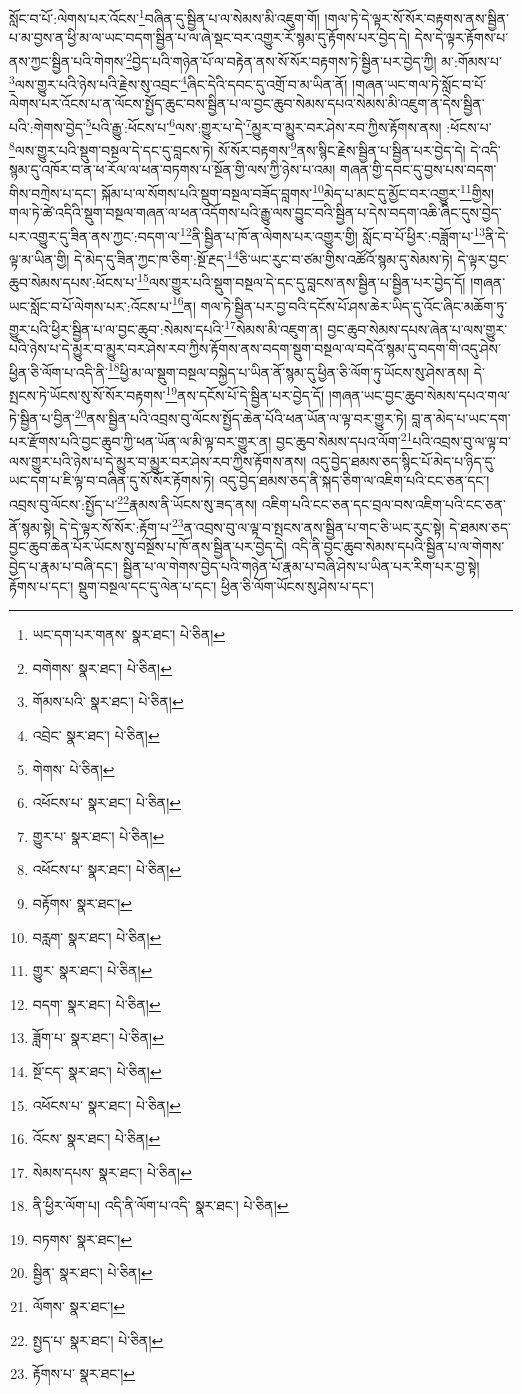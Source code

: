 སློང་བ་པོ་:ལེགས་པར་འོངས་\footnote{ཡང་དག་པར་གནས་  སྣར་ཐང་།  པེ་ཅིན། }བཞིན་དུ་སྦྱིན་པ་ལ་སེམས་མི་འཇུག་གོ། །གལ་ཏེ་དེ་ལྟར་སོ་སོར་བརྟགས་ནས་སྦྱིན་པ་མ་བྱས་ན་ཕྱི་མ་ལ་ཡང་བདག་སྦྱིན་པ་ལ་ཞེ་སྡང་བར་འགྱུར་རོ་སྙམ་དུ་རྟོགས་པར་བྱེད་དེ། དེས་དེ་ལྟར་རྟོགས་པ་ནས་ཀྱང་སྦྱིན་པའི་གེགས་\footnote{བགེགས་  སྣར་ཐང་།  པེ་ཅིན། }བྱེད་པའི་གཉེན་པོ་ལ་བརྟེན་ནས་སོ་སོར་བརྟགས་ཏེ་སྦྱིན་པར་བྱེད་ཀྱི། མ་:གོམས་པ་\footnote{གོམས་པའི་  སྣར་ཐང་།  པེ་ཅིན། }ལས་གྱུར་པའི་ཉེས་པའི་རྗེས་སུ་འབྲང་\footnote{འབྲེང་  སྣར་ཐང་།  པེ་ཅིན། }ཞིང་དེའི་དབང་དུ་འགྲོ་བ་མ་ཡིན་ནོ། །གཞན་ཡང་གལ་ཏེ་སློང་བ་པོ་ལེགས་པར་འོངས་པ་ན་ལོངས་སྤྱོད་ཆུང་བས་སྦྱིན་པ་ལ་བྱང་ཆུབ་སེམས་དཔའ་སེམས་མི་འཇུག་ན་དེས་སྦྱིན་པའི་:གེགས་བྱེད་\footnote{གེགས་  པེ་ཅིན། }པའི་རྒྱུ་:ཕོངས་པ་\footnote{འཕོངས་པ་  སྣར་ཐང་།  པེ་ཅིན། }ལས་:གྱུར་པ་དེ་\footnote{གྱུར་པ་  སྣར་ཐང་།  པེ་ཅིན། }མྱུར་བ་མྱུར་བར་ཤེས་རབ་ཀྱིས་རྟོགས་ནས། :ཕོངས་པ་\footnote{འཕོངས་པ་  སྣར་ཐང་།  པེ་ཅིན། }ལས་གྱུར་པའི་སྡུག་བསྔལ་དེ་དང་དུ་བླངས་ཏེ། སོ་སོར་བརྟགས་\footnote{བརྟོགས་  སྣར་ཐང་། }ནས་སྙིང་རྗེས་སྦྱིན་པ་སྦྱིན་པར་བྱེད་དེ། དེ་འདི་སྙམ་དུ་འཁོར་བ་ན་ཕ་རོལ་ལ་ཕན་བཏགས་པ་སྔོན་གྱི་ལས་ཀྱི་ཉེས་པ་འམ། གཞན་གྱི་དབང་དུ་བྱས་པས་བདག་གིས་བཀྲེས་པ་དང་། སྐོམ་པ་ལ་སོགས་པའི་སྡུག་བསྔལ་བཟོད་བླགས་\footnote{བརླག་  སྣར་ཐང་།  པེ་ཅིན། }མེད་པ་མང་དུ་མྱོང་བར་འགྱུར་\footnote{གྱུར་  སྣར་ཐང་།  པེ་ཅིན། }གྱིས། གལ་ཏེ་ཚེ་འདིའི་སྡུག་བསྔལ་གཞན་ལ་ཕན་འདོགས་པའི་རྒྱུ་ལས་བྱུང་བའི་སྦྱིན་པ་དེས་བདག་འཆི་ཞིང་དུས་བྱེད་པར་འགྱུར་དུ་ཟིན་ནས་ཀྱང་:བདག་ལ་\footnote{བདག་  སྣར་ཐང་།  པེ་ཅིན། }ནི་སྦྱིན་པ་ཁོ་ན་ལེགས་པར་འགྱུར་གྱི། སློང་བ་པོ་ཕྱིར་:བཟློག་པ་\footnote{ཟློག་པ་  སྣར་ཐང་།  པེ་ཅིན། }ནི་དེ་ལྟ་མ་ཡིན་གྱི། དེ་མེད་དུ་ཟིན་ཀྱང་ཁ་ཅིག་:སྔོ་རྔད་\footnote{སྔོ་ངད་  སྣར་ཐང་།  པེ་ཅིན། }ཅི་ཡང་རུང་བ་ཙམ་གྱིས་འཚོའོ་སྙམ་དུ་སེམས་ཏེ། དེ་ལྟར་བྱང་ཆུབ་སེམས་དཔས་:ཕོངས་པ་\footnote{འཕོངས་པ་  སྣར་ཐང་།  པེ་ཅིན། }ལས་གྱུར་པའི་སྡུག་བསྔལ་དེ་དང་དུ་བླངས་ནས་སྦྱིན་པ་སྦྱིན་པར་བྱེད་དོ། །གཞན་ཡང་སློང་བ་པོ་ལེགས་པར་:འོངས་པ་\footnote{འོངས་  སྣར་ཐང་།  པེ་ཅིན། }ན། གལ་ཏེ་སྦྱིན་པར་བྱ་བའི་དངོས་པོ་ཤས་ཆེར་ཡིད་དུ་འོང་ཞིང་མཆོག་ཏུ་གྱུར་པའི་ཕྱིར་སྦྱིན་པ་ལ་བྱང་ཆུབ་:སེམས་དཔའི་\footnote{སེམས་དཔས་  སྣར་ཐང་།  པེ་ཅིན། }སེམས་མི་འཇུག་ན། བྱང་ཆུབ་སེམས་དཔས་ཞེན་པ་ལས་གྱུར་པའི་ཉེས་པ་དེ་མྱུར་བ་མྱུར་བར་ཤེས་རབ་ཀྱིས་རྟོགས་ནས་བདག་སྡུག་བསྔལ་ལ་བདེའོ་སྙམ་དུ་བདག་གི་འདུ་ཤེས་ཕྱིན་ཅི་ལོག་པ་འདི་ནི་\footnote{ནི་ཕྱིར་ལོག་པ། འདི་ནི་ལོག་པ་འདི་  སྣར་ཐང་།  པེ་ཅིན། }ཕྱི་མ་ལ་སྡུག་བསྔལ་བསྐྱེད་པ་ཡིན་ནོ་སྙམ་དུ་ཕྱིན་ཅི་ལོག་ཏུ་ཡོངས་སུ་ཤེས་ནས། དེ་སྤངས་ཏེ་ཡོངས་སུ་སོ་སོར་བརྟགས་\footnote{བཏགས་  སྣར་ཐང་། }ནས་དངོས་པོ་དེ་སྦྱིན་པར་བྱེད་དོ། །གཞན་ཡང་བྱང་ཆུབ་སེམས་དཔའ་གལ་ཏེ་སྦྱིན་པ་བྱིན་\footnote{སྦྱིན་  སྣར་ཐང་།  པེ་ཅིན། }ནས་སྦྱིན་པའི་འབྲས་བུ་ལོངས་སྤྱོད་ཆེན་པོའི་ཕན་ཡོན་ལ་ལྟ་བར་གྱུར་ཏེ། བླ་ན་མེད་པ་ཡང་དག་པར་རྫོགས་པའི་བྱང་ཆུབ་ཀྱི་ཕན་ཡོན་ལ་མི་ལྟ་བར་གྱུར་ན། བྱང་ཆུབ་སེམས་དཔའ་ལོག་\footnote{ལོགས་  སྣར་ཐང་། }པའི་འབྲས་བུ་ལ་ལྟ་བ་ལས་གྱུར་པའི་ཉེས་པ་དེ་མྱུར་བ་མྱུར་བར་ཤེས་རབ་ཀྱིས་རྟོགས་ནས། འདུ་བྱེད་ཐམས་ཅད་སྙིང་པོ་མེད་པ་ཉིད་དུ་ཡང་དག་པ་ཇི་ལྟ་བ་བཞིན་དུ་སོ་སོར་རྟོགས་ཏེ། འདུ་བྱེད་ཐམས་ཅད་ནི་སྐད་ཅིག་ལ་འཇིག་པའི་ངང་ཅན་དང་། འབྲས་བུ་ལོངས་:སྤྱོད་པ་\footnote{སྤྱད་པ་  སྣར་ཐང་།  པེ་ཅིན། }རྣམས་ནི་ཡོངས་སུ་ཟད་ནས། འཇིག་པའི་ངང་ཅན་དང་བྲལ་བས་འཇིག་པའི་ངང་ཅན་ནོ་སྙམ་སྟེ། དེ་དེ་ལྟར་སོ་སོར་:རྟོག་པ་\footnote{རྟོགས་པ་  སྣར་ཐང་། }ན་འབྲས་བུ་ལ་ལྟ་བ་སྤངས་ནས་སྦྱིན་པ་གང་ཅི་ཡང་རུང་སྟེ། དེ་ཐམས་ཅད་བྱང་ཆུབ་ཆེན་པོར་ཡོངས་སུ་བསྔོས་པ་ཁོ་ནས་སྦྱིན་པར་བྱེད་དེ། འདི་ནི་བྱང་ཆུབ་སེམས་དཔའི་སྦྱིན་པ་ལ་གེགས་བྱེད་པ་རྣམ་པ་བཞི་དང་། སྦྱིན་པ་ལ་གེགས་བྱེད་པའི་གཉེན་པོ་རྣམ་པ་བཞི་ཤེས་པ་ཡིན་པར་རིག་པར་བྱ་སྟེ། རྟོགས་པ་དང་། སྡུག་བསྔལ་དང་དུ་ལེན་པ་དང་། ཕྱིན་ཅི་ལོག་ཡོངས་སུ་ཤེས་པ་དང་། 